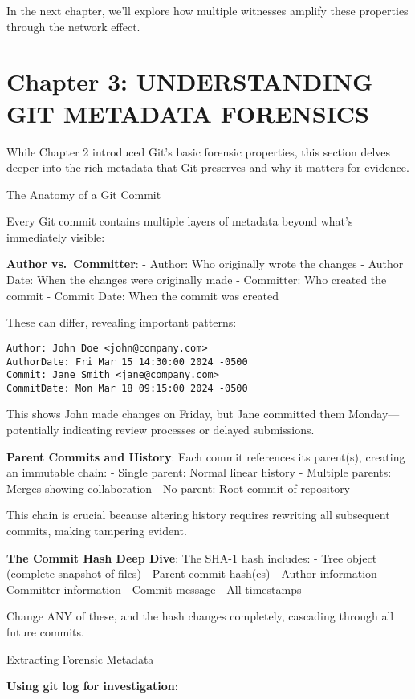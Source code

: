 In the next chapter, we'll explore how multiple witnesses amplify these
properties through the network effect.

\section{Chapter 3: UNDERSTANDING GIT METADATA
FORENSICS}\label{chapter-3-understanding-git-metadata-forensics}

While Chapter 2 introduced Git's basic forensic properties, this section
delves deeper into the rich metadata that Git preserves and why it
matters for evidence.

The Anatomy of a Git Commit

Every Git commit contains multiple layers of metadata beyond what's
immediately visible:

\textbf{Author vs.~Committer}: - Author: Who originally wrote the
changes - Author Date: When the changes were originally made -
Committer: Who created the commit - Commit Date: When the commit was
created

These can differ, revealing important patterns:

\begin{verbatim}
Author: John Doe <john@company.com>
AuthorDate: Fri Mar 15 14:30:00 2024 -0500
Commit: Jane Smith <jane@company.com>
CommitDate: Mon Mar 18 09:15:00 2024 -0500
\end{verbatim}

This shows John made changes on Friday, but Jane committed them
Monday---potentially indicating review processes or delayed submissions.

\textbf{Parent Commits and History}: Each commit references its
parent(s), creating an immutable chain: - Single parent: Normal linear
history - Multiple parents: Merges showing collaboration - No parent:
Root commit of repository

This chain is crucial because altering history requires rewriting all
subsequent commits, making tampering evident.

\textbf{The Commit Hash Deep Dive}: The SHA-1 hash includes: - Tree
object (complete snapshot of files) - Parent commit hash(es) - Author
information - Committer information - Commit message - All timestamps

Change ANY of these, and the hash changes completely, cascading through
all future commits.

Extracting Forensic Metadata

\textbf{Using git log for investigation}:


